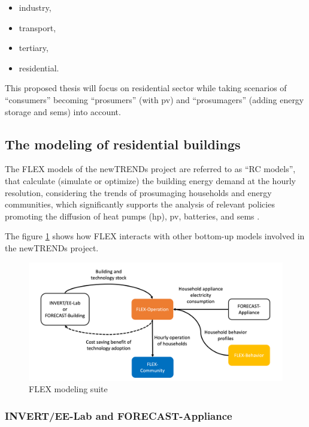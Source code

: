 \begin{itemize}
  \item industry, 
  \item transport,  
  \item tertiary, 
  \item residential.  
\end{itemize}

This proposed thesis will focus on residential sector 
while taking scenarios of “consumers” becoming “prosumers” (with \gls{pv}) and “prosumagers” (adding energy storage and \gls{sems}) \cite{consumer} into account.  


\subsection{The modeling of residential buildings}


The FLEX models of the newTRENDs project are referred to as “RC models”,
that calculate (simulate or optimize) the building energy demand at the hourly resolution,
considering the trends of prosumaging households and energy communities, 
which significantly supports the analysis of relevant policies promoting the diffusion of heat pumps (\gls{hp}), \gls{pv}, batteries, and \gls{sems} \cite{newtrends}.


The figure \ref{fig:flex} shows how FLEX interacts with other bottom-up models involved in the newTRENDs project.

\begin{figure}[h]
  \centering
  \includegraphics[width=\textwidth]{Images/flex.png}
  \caption{FLEX modeling suite}
  \label{fig:flex}
\end{figure}


\subsubsection{INVERT/EE-Lab and FORECAST-Appliance}


